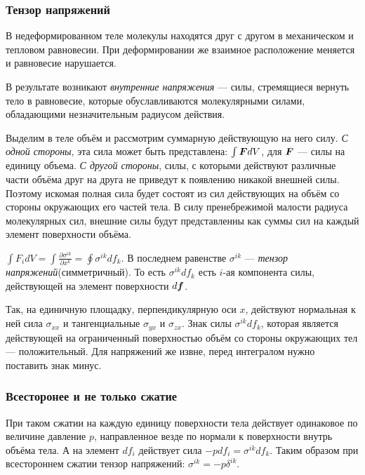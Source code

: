  \subsubsection*{Тензор напряжений}
 В недеформированном теле молекулы находятся друг с другом в механическом и тепловом равновесии. При деформировании же взаимное расположение меняется и равновесие нарушается.
 \begin{to_def}
 	В результате возникают \textit{внутренние напряжения} --- силы, стремящиеся вернуть тело в равновесие, которые обуславливаются молекулярными силами, обладающими незначительным радиусом действия.
 \end{to_def}

Выделим в теле объём и рассмотрим суммарную действующую на него силу.
\textit{С одной стороны}, эта сила может быть представлена: $\int \mbox{\boldmath $F$} d V$, для $\mbox{\boldmath $F$}$ --- силы на единицу объема.
\textit{С другой стороны}, силы, с которыми действуют различные части объёма друг на друга не приведут к появлению никакой внешней силы.
Поэтому искомая полная сила будет состоят из сил действующих на объём со стороны окружающих его частей тела. В силу пренебрежимой малости радиуса молекулярных сил, внешние силы будут представленны как суммы сил на каждый элемент поверхности объёма.
\begin{to_def}
	$\int F_i d V = \int \frac{\partial \sigma^{i k}}{\partial x^k} = \oint \sigma^{i k} d f_k$. В последнем равенстве $\sigma^{i k}$ --- \textit{тензор напряжений}(симметричный). То есть $\sigma^{i k} d f_k$ есть $i$-ая компонента силы, действующей на элемент поверхности $d \mbox{\boldmath $f$}$.
\end{to_def}
Так, на единичную площадку, перпендикулярную оси $x$, действуют нормальная к ней сила $\sigma_{x x}$ и тангенциальные $\sigma_{y x}$ и $\sigma_{z x}$.
Знак силы $\sigma^{i k} d f_k$, которая является действующей на ограниченный поверхностью объём со стороны окружающих тел --- положительный. Для напряжений же извне, перед интегралом нужно поставить знак минус.

\subsubsection*{Всесторонее и не только сжатие}
При таком сжатии на каждую единицу поверхности тела действует одинаковое по величине давление $p$, направленное везде по нормали к поверхности внутрь объёма тела. 
А на элемент $d f_i$ действует сила $-p d f_i = \sigma^{i k} d f_k$. 
Таким образом при всестороннем сжатии тензор напряжений: $\sigma^{i k} = -p \delta^{i k}$.

